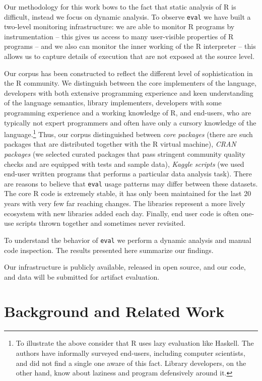 \documentclass[USenglish,cleveref, autoref, thm-restate]{lipics-v2019}
\newcommand{\eval}{\texttt{eval}\xspace}
\begin{document}
Our methodology for this work bows to the fact that static analysis of R is
difficult, instead we focus on dynamic analysis. To observe \eval we have
built a two-level monitoring infrastructure: we are able to monitor R
programs by instrumentation -- this gives us access to many user-visible
properties of R programs -- and we also can monitor the inner working of the
R interpreter -- this allows us to capture details of execution that are not
exposed at the source level.

Our corpus has been constructed to reflect the different level of
sophistication in the R community. We distinguish between the core
implementers of the language, developers with both extensive programming
experience and keen understanding of the language semantics, library
implementers, developers with some programming experience and a working
knowledge of R, and end-users, who are typically not expert programmers and
often have only a cursory knowledge of the language.\footnote{To illustrate
  the above consider that R uses lazy evaluation like Haskell. The authors
  have informally surveyed end-users, including computer scientists, and did
  not find a single one aware of this fact. Library developers, on the other
  hand, know about laziness and program defensively around it.}  Thus, our
corpus distinguished between \emph{core packages} (there are
\CorpusCorePackages such packages that are distributed together with the R
virtual machine), \emph{CRAN packages} (we selected \CorpusPackages curated
packages that pass stringent community quality checks and are equipped with
tests and sample data), \emph{Kaggle scripts} (we used \CorpusFinishedKaggle
end-user written programs that performs a particular data analysis
task). There are reasons to believe that \eval usage patterns may differ
between these datasets. The core R code is extremely stable, it has only
been maintained for the last 20 years with very few far reaching
changes. The libraries represent a more lively ecosystem with new libraries
added each day.  Finally, end user code is often one-use scripts thrown
together and sometimes never revisited.


To understand the behavior of \eval we perform a dynamic analysis and manual
code inspection. The results presented here summarize our findings.

Our infrastructure is publicly available, released in open source, and our
code, and data will be submitted for artifact evaluation.


\section{Background and Related Work}
\end{document}
